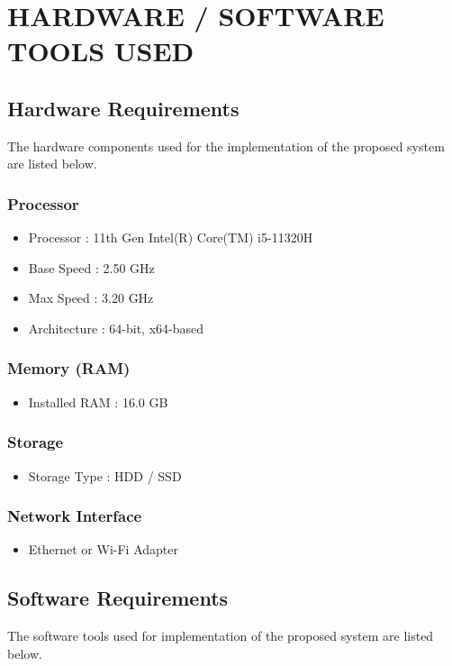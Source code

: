 \chapter{HARDWARE / SOFTWARE TOOLS USED}
\section{Hardware Requirements}
The hardware components used for the implementation 
of the proposed system are listed below.
\subsection{Processor}
\begin{itemize}
\item Processor : 11th Gen Intel(R) Core(TM) i5-11320H  
\item Base Speed : 2.50 GHz  
\item Max Speed : 3.20 GHz  
\item Architecture : 64-bit, x64-based  
\end{itemize}
\subsection{Memory (RAM)}
\begin{itemize}
\item Installed RAM : 16.0 GB 
\end{itemize}
\subsection{Storage}
\begin{itemize}
\item Storage Type : HDD / SSD 
\end{itemize}
\subsection{Network Interface}
\begin{itemize}
\item Ethernet or Wi-Fi Adapter  
\end{itemize}
\section{Software Requirements}
The software tools used for implementation 
of the proposed system are listed below.
